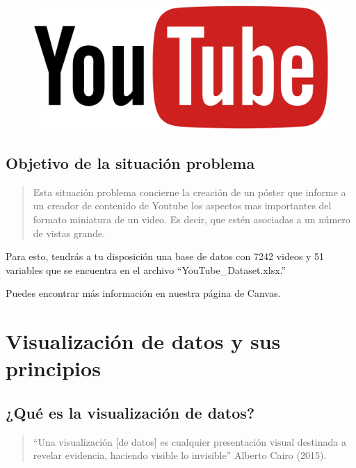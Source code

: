 \documentclass[
  letterpaper,
  DIV=11,
  numbers=noendperiod]{scrartcl}
\begin{document}
\begin{figure}

\hfill{} \includegraphics[width=4.55208in,height=\textheight]{images/clipboard-2009057073.png}

\end{figure}

\hypertarget{objetivo-de-la-situaciuxf3n-problema}{%
\subsection{Objetivo de la situación
problema}\label{objetivo-de-la-situaciuxf3n-problema}}

\begin{quote}
Esta situación problema concierne la creación de un póster que informe a
un creador de contenido de Youtube los aspectos mas importantes del
formato miniatura de un video. Es decir, que estén asociadas a un número
de vistas grande.
\end{quote}

Para esto, tendrás a tu disposición una base de datos con 7242 videos y
51 variables que se encuentra en el archivo ``YouTube\_Dataset.xlsx.''

Puedes encontrar más información en nuestra página de Canvas.

\hypertarget{visualizaciuxf3n-de-datos-y-sus-principios}{%
\section{Visualización de datos y sus
principios}\label{visualizaciuxf3n-de-datos-y-sus-principios}}

\hypertarget{quuxe9-es-la-visualizaciuxf3n-de-datos}{%
\subsection{¿Qué es la visualización de
datos?}\label{quuxe9-es-la-visualizaciuxf3n-de-datos}}

\begin{quote}
``Una visualización {[}de datos{]} es cualquier presentación visual
destinada a revelar evidencia, haciendo visible lo invisible'' Alberto
Cairo (2015).
\end{quote}
\end{document}
